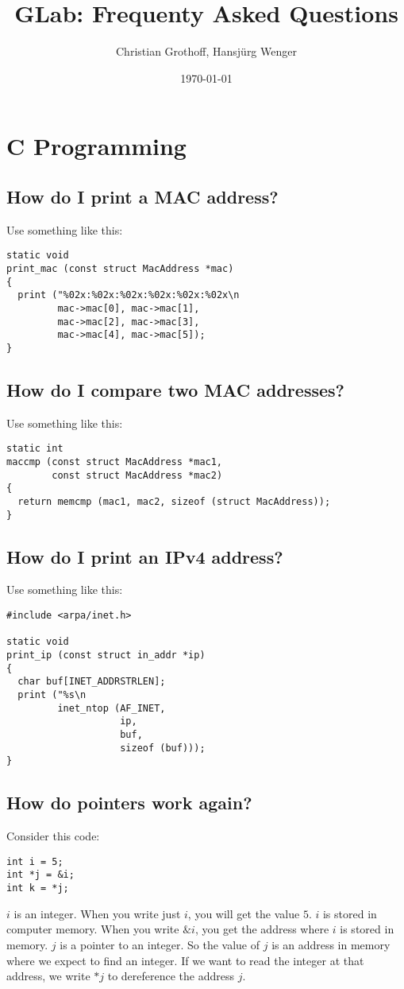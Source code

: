 \documentclass{article}
\title{GLab: Frequenty Asked Questions}
\author{Christian Grothoff, Hansjürg Wenger}
\date{\today}
\begin{document}
\maketitle


\section{C Programming}

\subsection{How do I print a MAC address?}

Use something like this:
\begin{verbatim}
static void
print_mac (const struct MacAddress *mac)
{
  print ("%02x:%02x:%02x:%02x:%02x:%02x\n
         mac->mac[0], mac->mac[1],
         mac->mac[2], mac->mac[3],
         mac->mac[4], mac->mac[5]);
}
\end{verbatim}

\subsection{How do I compare two MAC addresses?}

Use something like this:
\begin{verbatim}
static int
maccmp (const struct MacAddress *mac1,
        const struct MacAddress *mac2)
{
  return memcmp (mac1, mac2, sizeof (struct MacAddress));
}
\end{verbatim}

\subsection{How do I print an IPv4 address?}

Use something like this:
\begin{verbatim}
#include <arpa/inet.h>

static void
print_ip (const struct in_addr *ip)
{
  char buf[INET_ADDRSTRLEN];
  print ("%s\n
         inet_ntop (AF_INET,
                    ip,
                    buf,
                    sizeof (buf)));
}
\end{verbatim}


\subsection{How do pointers work again?}

Consider this code:
\begin{verbatim}
int i = 5;
int *j = &i;
int k = *j;
\end{verbatim}
$i$ is an integer. When you write just $i$, you will get the value
$5$. $i$ is stored in computer memory. When you write $\&i$, you get
the address where $i$ is stored in memory.  $j$ is a pointer to
an integer. So the value of $j$ is an address in memory where we
expect to find an integer.  If we want to read the integer at that
address, we write $*j$ to dereference the address $j$.
\end{document}
